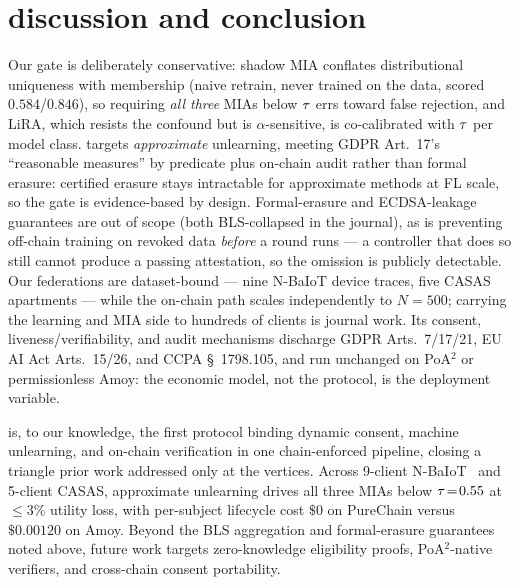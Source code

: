 \section{discussion and conclusion}
\label{sec:discussion}\label{sec:conclusion}

Our gate is deliberately conservative: shadow MIA conflates
distributional uniqueness with membership (naive retrain, never trained
on the data, scored $0.584$/$0.846$), so requiring \emph{all three} MIAs
below $\tau$ errs toward false rejection, and LiRA, which resists the
confound but is $\alpha$-sensitive, is co-calibrated with $\tau$ per
model class. \sysname targets \emph{approximate} unlearning, meeting
GDPR Art.~17's ``reasonable measures'' by predicate plus on-chain audit
rather than formal erasure: certified erasure stays intractable for
approximate methods at FL scale, so the gate is evidence-based by
design. Formal-erasure and ECDSA-leakage guarantees are out of scope
(both BLS-collapsed in the journal), as is preventing off-chain
training on revoked data \emph{before} a round runs --- a controller
that does so still cannot produce a passing attestation, so the
omission is publicly detectable. Our federations are dataset-bound ---
nine N-BaIoT device traces, five CASAS apartments --- while the
on-chain path scales independently to $N\!=\!500$; carrying the learning
and MIA side to hundreds of clients is journal work. Its
consent, liveness/verifiability, and audit mechanisms discharge GDPR
Arts.~7/17/21, EU AI Act Arts.~15/26, and CCPA \S~1798.105, and run
unchanged on PoA$^2$ or permissionless Amoy: the economic model, not
the protocol, is the deployment variable.

\sysname is, to our knowledge, the first protocol binding dynamic
consent, machine unlearning, and on-chain verification in one
chain-enforced pipeline, closing a triangle prior work addressed only
at the vertices. Across 9-client
N-BaIoT~\cite{meidan2018nbaiot} and 5-client CASAS, approximate
unlearning drives all three MIAs below $\tau\!=\!0.55$ at
$\le\!3\%$ utility loss, with per-subject lifecycle cost $\$0$ on
PureChain versus $\$0.00120$ on Amoy. Beyond the BLS aggregation and
formal-erasure guarantees noted above, future work targets
zero-knowledge eligibility proofs, PoA$^2$-native verifiers, and
cross-chain consent portability.
